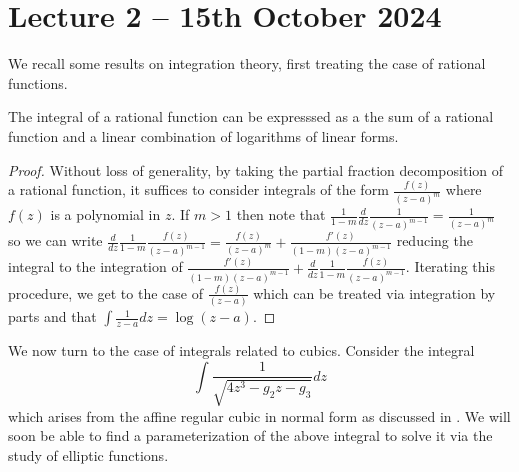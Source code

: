 \section{Lecture 2 -- 15th October 2024}\label{sec: lecture 2}
We recall some results on integration theory, first treating the case of rational functions. 
\begin{proposition}\label{prop: integral of rational function}
    The integral of a rational function can be expresssed as a the sum of a rational function and a linear combination of logarithms of linear forms.
\end{proposition}
\begin{proof}
    Without loss of generality, by taking the partial fraction decomposition of a rational function, it suffices to consider integrals of the form $\frac{f(z)}{(z-a)^{m}}$ where $f(z)$ is a polynomial in $z$. If $m>1$ then note that $\frac{1}{1-m}\frac{d}{dz}\frac{1}{(z-a)^{m-1}}=\frac{1}{(z-a)^{m}}$ so we can write $\frac{d}{dz}\frac{1}{1-m}\frac{f(z)}{(z-a)^{m-1}}=\frac{f(z)}{(z-a)^{m}}+\frac{f'(z)}{(1-m)(z-a)^{m-1}}$ reducing the integral to the integration of $\frac{f'(z)}{(1-m)(z-a)^{m-1}}+\frac{d}{dz}\frac{1}{1-m}\frac{f(z)}{(z-a)^{m-1}}$. Iterating this procedure, we get to the case of $\frac{f(z)}{(z-a)}$ which can be treated via integration by parts and that $\int\frac{1}{z-a}dz=\log(z-a)$. 
\end{proof}
We now turn to the case of integrals related to cubics. Consider the integral 
$$\int\frac{1}{\sqrt{4z^{3}-g_{2}z-g_{3}}}dz$$
which arises from the affine regular cubic in normal form as discussed in . We will soon be able to find a parameterization of the above integral to solve it via the study of elliptic functions. 

